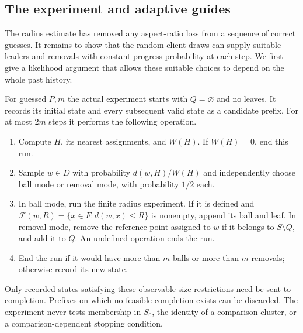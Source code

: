 \subsection{The experiment and adaptive guides}

The radius estimate has removed any aspect-ratio loss from a sequence
of correct guesses.  It remains to show that the random client draws
can supply suitable leaders and removals with constant progress
probability at each step.  We first give a likelihood argument that
allows these suitable choices to depend on the whole past history.

For guessed $P,m$ the actual experiment starts with $Q=\varnothing$ and no
leaves.  It records its initial state and every subsequent valid state as
a candidate prefix.  For at most $2m$ steps it performs the following
operation.
\begin{enumerate}[label=\textup{(\arabic*)}]
\item Compute $H$, its nearest assignments, and $W(H)$.  If $W(H)=0$,
      end this run.
\item Sample $w\in D$ with probability $d(w,H)/W(H)$ and independently
      choose ball mode or removal mode, with probability $1/2$ each.
\item In ball mode, run the finite radius experiment.  If it is defined
      and $\mathcal F(w,R)=\{x\in F:d(w,x)\le R\}$ is nonempty,
      append its ball and leaf.  In removal mode, remove the reference
      point assigned to $w$ if it belongs to $S\setminus Q$, and add
      it to $Q$.  An undefined operation ends the run.
\item End the run if it would have more than $m$ balls or more than $m$
      removals; otherwise record its new state.
\end{enumerate}
Only recorded states satisfying these observable size restrictions need be
sent to completion.  Prefixes on which no feasible completion exists can
be discarded.  The experiment never tests membership in $S_0$, the
identity of a comparison cluster, or a comparison-dependent stopping
condition.

